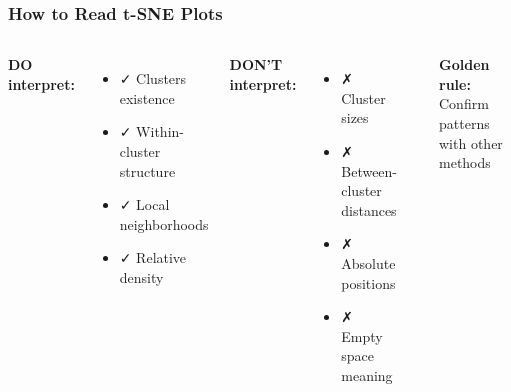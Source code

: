 \documentclass[aspectratio=169]{beamer}
\begin{document}
\begin{frame}
\frametitle{How to Read t-SNE Plots}
\begin{columns}[T]
\textbf{DO interpret:}
\begin{itemize}
\small
\item ✓ Clusters existence
\item ✓ Within-cluster structure  
\item ✓ Local neighborhoods
\item ✓ Relative density
\end{itemize}

\vspace{0.3cm}
\textbf{DON'T interpret:}
\begin{itemize}
\small
\item ✗ Cluster sizes
\item ✗ Between-cluster distances
\item ✗ Absolute positions
\item ✗ Empty space meaning
\end{itemize}

\begin{center}
\end{center}

\textbf{Golden rule:}\\
\small Confirm patterns with other methods
\end{columns}
\end{frame}
\end{document}
